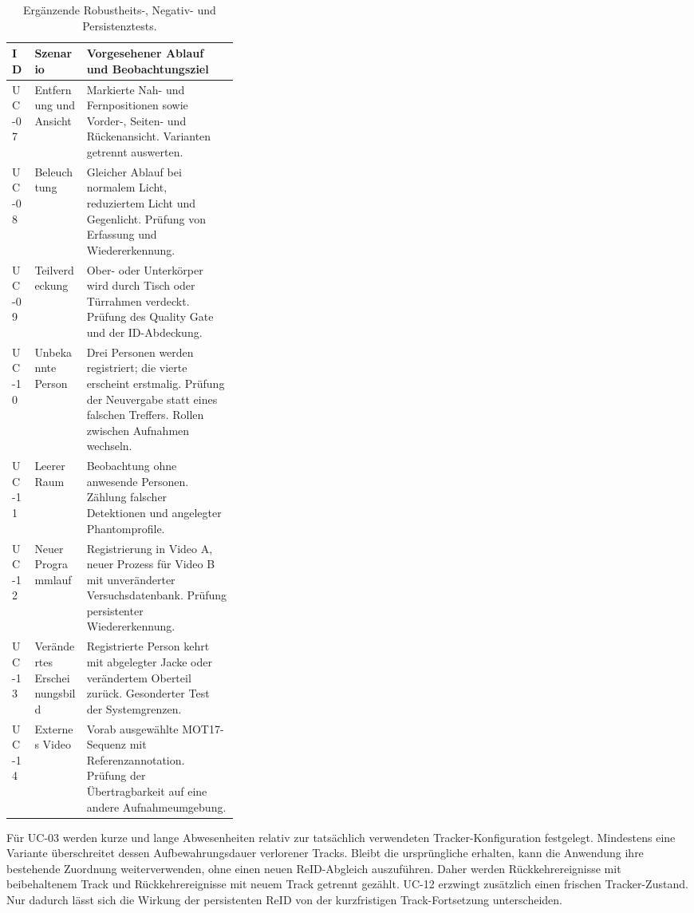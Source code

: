 \documentclass[runningheads]{llncs}
\begin{document}
\begin{table}[tbp]
\caption{Ergänzende Robustheits-, Negativ- und Persistenztests.}
\label{tab:eval-extended-cases}
\centering
\small
\begin{tabularx}{\linewidth}{@{}p{0.10\linewidth}p{0.23\linewidth}X@{}}
\toprule
ID & Szenario & Vorgesehener Ablauf und Beobachtungsziel \\
\midrule
UC-07 & Entfernung und Ansicht & Markierte Nah- und Fernpositionen sowie Vorder-, Seiten- und Rückenansicht. Varianten getrennt auswerten. \\
UC-08 & Beleuchtung & Gleicher Ablauf bei normalem Licht, reduziertem Licht und Gegenlicht. Prüfung von Erfassung und Wiedererkennung. \\
UC-09 & Teilverdeckung & Ober- oder Unterkörper wird durch Tisch oder Türrahmen verdeckt. Prüfung des Quality Gate und der ID-Abdeckung. \\
UC-10 & Unbekannte Person & Drei Personen werden registriert; die vierte erscheint erstmalig. Prüfung der Neuvergabe statt eines falschen Treffers. Rollen zwischen Aufnahmen wechseln. \\
UC-11 & Leerer Raum & Beobachtung ohne anwesende Personen. Zählung falscher Detektionen und angelegter Phantomprofile. \\
UC-12 & Neuer Programmlauf & Registrierung in Video A, neuer Prozess für Video B mit unveränderter Versuchsdatenbank. Prüfung persistenter Wiedererkennung. \\
UC-13 & Verändertes Erscheinungsbild & Registrierte Person kehrt mit abgelegter Jacke oder verändertem Oberteil zurück. Gesonderter Test der Systemgrenzen. \\
UC-14 & Externes Video & Vorab ausgewählte MOT17-Sequenz mit Referenzannotation. Prüfung der Übertragbarkeit auf eine andere Aufnahmeumgebung. \\
\bottomrule
\end{tabularx}
\end{table}

Für UC-03 werden kurze und lange Abwesenheiten relativ zur tatsächlich verwendeten Tracker-Konfiguration festgelegt. Mindestens eine Variante überschreitet dessen Aufbewahrungsdauer verlorener Tracks. Bleibt die ursprüngliche  erhalten, kann die Anwendung ihre bestehende Zuordnung weiterverwenden, ohne einen neuen ReID-Abgleich auszuführen. Daher werden Rückkehrereignisse mit beibehaltenem Track und Rückkehrereignisse mit neuem Track getrennt gezählt. UC-12 erzwingt zusätzlich einen frischen Tracker-Zustand. Nur dadurch lässt sich die Wirkung der persistenten ReID von der kurzfristigen Track-Fortsetzung unterscheiden.
\end{document}
